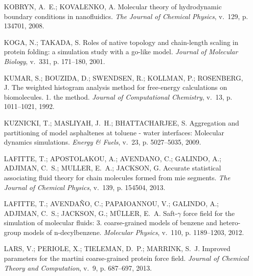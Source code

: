 \documentclass[
	12pt,				%
	openany,			%
	oneside,			%
	a4paper,			%
	english,			%
	brazil				%
	]{abntex2}
\begin{document}
\begin{thebibliography}{}
{KOBRYN, A.~E.; KOVALENKO, A. Molecular theory of hydrodynamic boundary
  conditions in nanofluidics.
\emph{The Journal of Chemical Physics}, v.~129, p. 134701, 2008.}

{KOGA, N.; TAKADA, S. Roles of native topology and chain-length scaling in
  protein folding: a simulation study with a go-like model.
\emph{Journal of Molecular Biology}, v.~331, p. 171–180, 2001.}

{KUMAR, S.; BOUZIDA, D.; SWENDSEN, R.; KOLLMAN, P.; ROSENBERG, J. The weighted
  histogram analysis method for free-energy calculations on biomolecules. 1.
  the method.
\emph{Journal of Computational Chemistry}, v.~13, p. 1011--1021, 1992.}

{KUZNICKI, T.; MASLIYAH, J.~H.; BHATTACHARJEE, S. Aggregation and partitioning
  of model asphaltenes at toluene - water interfaces: Molecular dynamics
  simulations.
\emph{Energy \& Fuels}, v.~23, p. 5027–5035, 2009.}

{LAFITTE, T.; APOSTOLAKOU, A.; AVENDANO, C.; GALINDO, A.; ADJIMAN, C.~S.;
  MULLER, E.~A.; JACKSON, G. Accurate statistical associating fluid theory for
  chain molecules formed from mie segments.
\emph{The Journal of Chemical Physics}, v.~139, p. 154504, 2013.}

{LAFITTE, T.; AVENDA{\~N}O, C.; PAPAIOANNOU, V.; GALINDO, A.; ADJIMAN, C.~S.;
  JACKSON, G.; M\"ULLER, E.~A. Saft-$\gamma$ force field for the simulation of
  molecular fluids: 3. coarse-grained models of benzene and hetero-group models
  of n-decylbenzene.
\emph{Molecular Physics}, v.~110, p. 1189–1203, 2012.}

{LARS, V.; PERIOLE, X.; TIELEMAN, D.~P.; MARRINK, S.~J. Improved parameters for
  the martini coarse-grained protein force field.
\emph{Journal of Chemical Theory and Computation}, v.~9, p. 687--697, 2013.}


\end{thebibliography}
\end{document}
